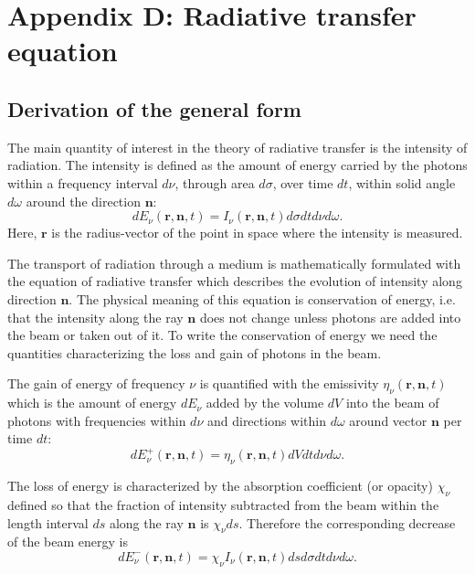 \documentclass[paper=a4, fontsize=11pt]{article}
\numberwithin{equation}{section}
\numberwithin{figure}{section}
\numberwithin{table}{section}
\newcommand{\mb}[1]{\mathbf{#1}}
\begin{document}
\clearpage
\section{Appendix D: Radiative transfer equation}\label{sect:rte}
\subsection{Derivation of the general form}\label{sect:dgf}
The main quantity of interest in the theory of radiative transfer is the intensity of radiation.
The intensity is defined as the amount of energy carried by the photons within a frequency interval $d\nu$,
through area $d\sigma$, over time $dt$, within solid angle $d\omega$ around the direction $\mb{n}$:
\begin{equation}\label{eq:int}
dE_\nu(\mb{r}, \mb{n}, t) = I_\nu(\mb{r}, \mb{n}, t) d\sigma dtd\nu d\omega.
\end{equation}
Here, $\mb{r}$ is the radius-vector of the point in space where the intensity is measured.

The transport of radiation through a medium is mathematically formulated with the equation of radiative transfer which
describes the evolution of intensity along direction $\mb{n}$.
The physical meaning of this equation is conservation of energy, i.e. that the intensity
along the ray $\mb{n}$ does not change unless photons are added into the beam or taken out of it.
To write the conservation of energy we need the quantities characterizing the loss and gain of photons in the beam.

The gain of energy of frequency $\nu$ is quantified with the emissivity $\eta_\nu(\mb{r}, \mb{n}, t)$
which is the amount of energy $dE_\nu$ added by the volume $dV$ into the beam of photons with frequencies within $d\nu$
and directions within $d\omega$ around vector $\mb{n}$ per time $dt$:
\begin{equation}\label{eq:emis}
dE^+_\nu(\mb{r}, \mb{n}, t) = \eta_\nu(\mb{r}, \mb{n}, t)dVdtd\nu d\omega.
\end{equation}

The loss of energy is characterized by the absorption coefficient (or opacity) $\chi_\nu$
defined so that the fraction of intensity subtracted from the beam within the length interval $ds$
along the ray $\mb{n}$ is $\chi_\nu ds$.
Therefore the corresponding decrease of the beam energy is
\begin{equation}\label{eq:abs}
dE^-_\nu(\mb{r}, \mb{n}, t) = \chi_\nu I_\nu(\mb{r}, \mb{n}, t)dsd\sigma dtd\nu d\omega.
\end{equation}
\end{document}
